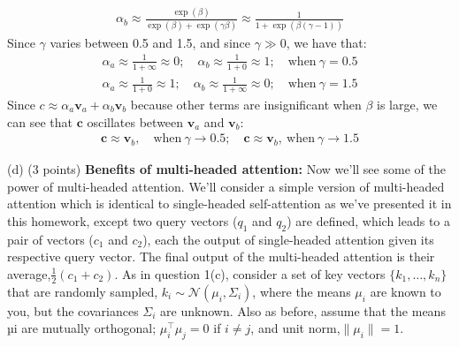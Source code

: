 \documentclass[letterpaper,12pt]{article}
\begin{document}
\begin{itemize}
{\begin{equation*}
			\begin{aligned}
				\alpha_b \approx \frac{\exp(\beta)}{\exp(\beta) + \exp(\gamma  \beta)} \approx \frac{1}{1+\exp(\beta(\gamma-1))}
			\end{aligned}
		\end{equation*}
		Since $\gamma$ varies between 0.5 and 1.5, and since $\gamma \gg 0$, we have that:
		\begin{equation*}
			\begin{aligned}
				\alpha_a \approx \frac{1}{1 + \infty} \approx 0; \quad \alpha_b \approx \frac{1}{1+0} \approx 1; \quad \text{when} \ \gamma = 0.5
			\end{aligned}
		\end{equation*}
		\begin{equation*}
			\begin{aligned}
				\alpha_a \approx \frac{1}{1 + 0} \approx 1; \quad \alpha_b \approx \frac{1}{1+\infty} \approx 0; \quad \text{when} \ \gamma = 1.5
			\end{aligned}
		\end{equation*}
		Since $c \approx \alpha_a \mathbf{v}_a + \alpha_b \mathbf{v}_b$ because other terms are insignificant when $\beta$ is large, we can see that $\mathbf{c}$ oscillates between $\mathbf{v}_a$ and $\mathbf{v}_b$:
		\begin{equation*}
			\begin{aligned}
				\mathbf{c} \approx \mathbf{v}_b, \quad \text{when} \ \gamma \rightarrow 0.5; \quad \mathbf{c} \approx \mathbf{v}_b, \ \text{when} \ \gamma \rightarrow 1.5 
			\end{aligned}
		\end{equation*}
		}

	\end{itemize}	
	
	\noindent (d) (3 points) \textbf{Benefits of multi-headed attention:} Now we'll see some of the power of multi-headed attention. We'll consider a simple version of multi-headed attention which is identical to single-headed self-attention as we've presented it in this homework, except two query vectors ($q_1$ and $q_2$) are defined, which leads to a pair of vectors ($c_1$ and $c_2$), each the output of single-headed attention given its respective query vector. The final output of the multi-headed attention is their average,$\frac{1}{2}(c_1+c_2)$. As in question 1(c), consider a set of key vectors $\{k_1, \ldots , k_n\}$ that are randomly sampled, $k_i \sim \mathcal{N} (\mu_i, \Sigma_i)$, where the means $\mu_i$ are known to you, but the covariances $\Sigma_i$ are unknown. Also as before,	assume that the means µi are mutually orthogonal; $\mu^\top_i \mu_j = 0$ if $i \neq j$, and unit norm,$\|\mu_i\|= 1$.
	
\end{document}
